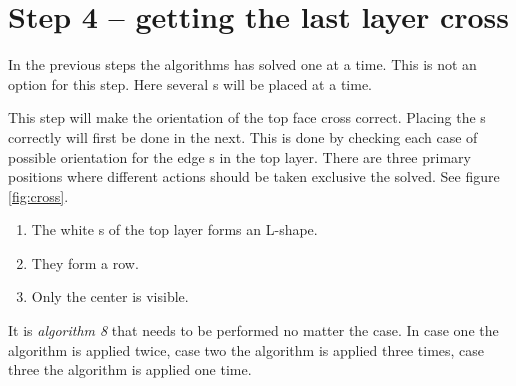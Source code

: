 \section{Step 4 --  getting the last layer cross}
In the previous steps the algorithms has solved one \cpiece{} at a time. 
This is not an option for this step. 
Here several \cpiece{}s will be placed at a time. 

This step will make the orientation of the top face cross correct. 
Placing the \cpiece{}s correctly will first be done in the next. 
This is done by checking each case of possible orientation for the edge \cpiece{}s in the top layer. 
There are three primary positions where different actions should be taken exclusive the solved. See figure \ref{fig:cross}. 
\begin{enumerate}
\item The white \facelet{}s of the top layer forms an L-shape.
\item They form a row.
\item Only the center \facelet{} is visible. 
\end{enumerate}
It is \textit{algorithm 8} that needs to be performed no matter the case. In case one the algorithm is applied twice, case two the algorithm is applied three times, case three the algorithm is applied one time. 



